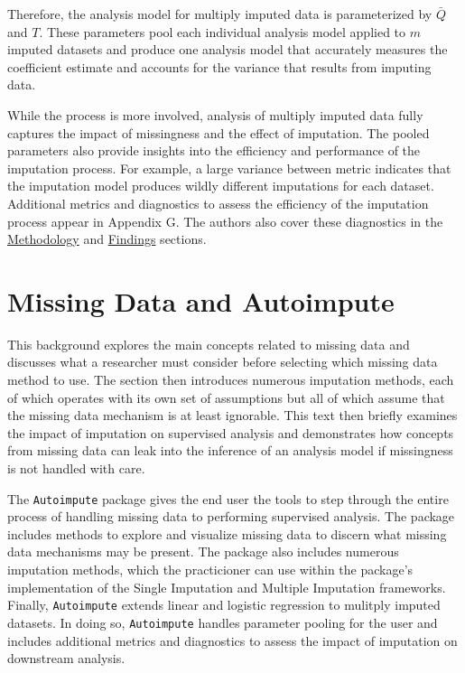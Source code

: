 \documentclass[12pt,oneside]{chicagocapstone}
\begin{document}
Therefore, the analysis model for multiply imputed data is parameterized
by \(\bar Q\) and \(T\). These parameters pool each individual analysis
model applied to \(m\) imputed datasets and produce one analysis model
that accurately measures the coefficient estimate and accounts for the
variance that results from imputing data.

While the process is more involved, analysis of multiply imputed data
fully captures the impact of missingness and the effect of imputation.
The pooled parameters also provide insights into the efficiency and
performance of the imputation process. For example, a large variance
between metric indicates that the imputation model produces wildly
different imputations for each dataset. Additional metrics and
diagnostics to assess the efficiency of the imputation process appear in
Appendix G. The authors also cover these diagnostics in the
\protect\hyperlink{methodology}{Methodology} and
\protect\hyperlink{findings}{Findings} sections.

\section*{Missing Data and
Autoimpute}\label{background-missing-data-autoimpute}

This background explores the main concepts related to missing data and
discusses what a researcher must consider before selecting which missing
data method to use. The section then introduces numerous imputation
methods, each of which operates with its own set of assumptions but all
of which assume that the missing data mechanism is at least ignorable.
This text then briefly examines the impact of imputation on supervised
analysis and demonstrates how concepts from missing data can leak into
the inference of an analysis model if missingness is not handled with
care.

The \texttt{Autoimpute} package gives the end user the tools to step
through the entire process of handling missing data to performing
supervised analysis. The package includes methods to explore and
visualize missing data to discern what missing data mechanisms may be
present. The package also includes numerous imputation methods, which
the practicioner can use within the package's implementation of the
Single Imputation and Multiple Imputation frameworks. Finally,
\texttt{Autoimpute} extends linear and logistic regression to mulitply
imputed datasets. In doing so, \texttt{Autoimpute} handles parameter
pooling for the user and includes additional metrics and diagnostics to
assess the impact of imputation on downstream analysis.
\end{document}

